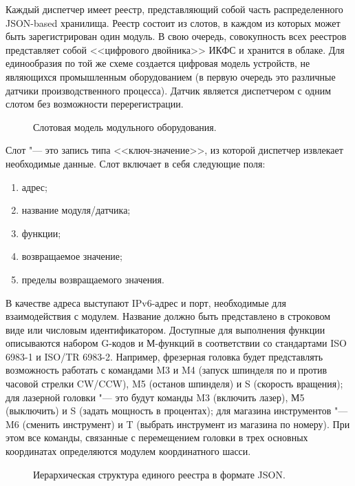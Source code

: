Каждый диспетчер имеет реестр, представляющий собой часть распределенного JSON-based хранилища. Реестр состоит из слотов, в каждом из которых может быть зарегистрирован один модуль. В свою очередь, совокупность всех реестров представляет собой <<цифрового двойника>> ИКФС и хранится в облаке. Для единообразия по той же схеме создается цифровая модель устройств, не являющихся промышленным оборудованием (в первую очередь это различные датчики производственного процесса). Датчик является диспетчером с одним слотом без возможности перерегистрации.

\begin{figure}[ht]
	\caption{Слотовая модель модульного оборудования.}\label{fig:main-arch}
\end{figure}

Слот "--- это запись типа <<ключ-значение>>, из которой диспетчер извлекает необходимые данные. Слот включает в себя следующие поля:

\begin{enumerate}
	\item адрес;
	\item название модуля/датчика;
	\item функции;
	\item возвращаемое значение;
	\item пределы возвращаемого значения.
\end{enumerate}

В качестве адреса выступают IPv6-адрес и порт, необходимые для взаимодействия с модулем. Название должно быть представлено в строковом виде или числовым идентификатором. Доступные для выполнения функции описываются набором G-кодов и М-функций в соответствии со стандартами ISO 6983-1 и ISO/TR 6983-2.
Например, фрезерная головка будет представлять возможность работать с командами M3 и M4 (запуск шпинделя по и против часовой стрелки CW/CCW), M5 (останов шпинделя) и S (скорость вращения); для лазерной головки "--- это будут команды M3 (включить лазер), М5 (выключить) и S (задать мощность в процентах); для магазина инструментов "--- M6 (сменить инструмент) и T (выбрать инструмент из магазина по номеру).  При этом все команды, связанные с перемещением головки в трех основных координатах определяются модулем координатного шасси.

\begin{figure}[ht]
\caption{Иерархическая структура единого реестра в формате JSON.}\label{fig:json}
\end{figure}

